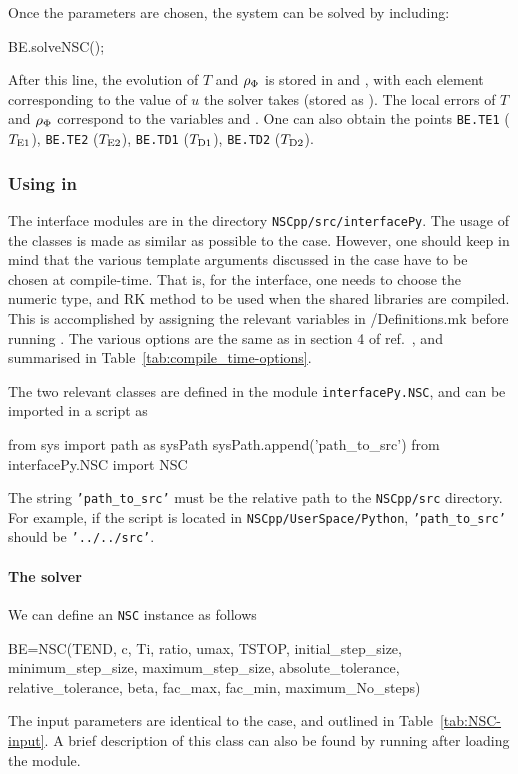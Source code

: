 \documentclass[11pt,a4paper]{article}
\begin{document}
Once the parameters are chosen, the system can be solved by including:
%
\begin{cpp}
	BE.solveNSC();
\end{cpp}
%
After this line, the evolution of $T$ and $\rho_{\Phi}$ is stored in  and , with each element corresponding to the value of $u$ the solver takes (stored as ). The local errors of $T$ and $\rho_{\Phi}$ correspond to the variables  and . 
%
One can also obtain the points {\tt BE.TE1} ($T_{\rm E1}{}$), {\tt BE.TE2} ($T_{\rm E2}{}$), {\tt BE.TD1} ($T_{\rm D1}{}$), {\tt BE.TD2} ($T_{\rm D2}{}$).

\subsubsection{Using \nsc in \PY}\label{sec:begin_py}
%
The \PY interface modules are in the directory {\tt NSCpp/src/interfacePy}. The usage of the classes is made as similar as possible to the \CPP case. However, one should keep in mind that the various template arguments discussed in the \CPP case have to be chosen at compile-time. That is, for the \PY interface, one needs to choose the numeric type, and RK method to be used when the shared libraries are compiled. This is accomplished by assigning the relevant variables in {\nsc/Definitions.mk} before running . The various options are the same as in section 4 of ref.~\cite{Karamitros:2021nxi}, and summarised in Table~\ref{tab:compile_time-options}.

The two relevant classes are defined in the module {\tt interfacePy.NSC}, and can be imported in a \PY script as 
%
\begin{py}
	from sys import path as sysPath
	sysPath.append('path_to_src')
	from interfacePy.NSC import NSC 
\end{py}
%
The string {\tt 'path\_to\_src'} must be the relative path to the {\tt NSCpp/src} directory. For example, if the script is located in {\tt NSCpp/UserSpace/Python}, {\tt 'path\_to\_src'} should be {\tt '../../src'}.

\paragraph{The solver}
%
We can define an {\tt NSC} instance as follows 
%
\begin{py}
	BE=NSC(TEND, c, Ti, ratio, umax, TSTOP,
		     initial_step_size, minimum_step_size, maximum_step_size, absolute_tolerance, 
		     relative_tolerance, beta, fac_max, fac_min, maximum_No_steps)
\end{py}
%
The input parameters are identical to the \CPP case, and outlined in Table~\ref{tab:NSC-input}. A brief description of this class can also be found by running  after loading the module. 
\end{document}
